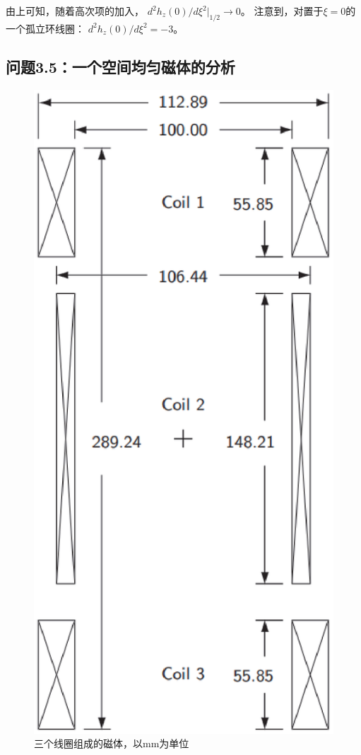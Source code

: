 由上可知，随着高次项的加入， $d^2h_z(0)/d\xi^2|_{1/2}\rightarrow 0$。
注意到，对置于$\xi=0$的一个孤立环线圈： $d^2h_z(0)/d\xi^2=−3$。



\subsection{问题3.5：一个空间均匀磁体的分析}
\begin{figure}[htbp]
	\centering
	\includegraphics[scale=0.6]{chpt3/figs/fig3.25.eps}
	\caption{三个线圈组成的磁体，以mm为单位}
\end{figure}
